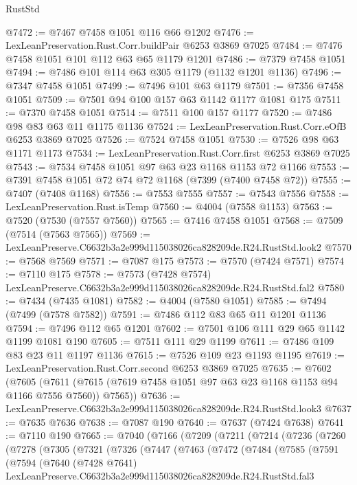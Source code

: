 \begin{lexlean}{RustStd}
\begin{coremodule}
@7472 := @7467 @7458 @1051 @116 @66 @1202
@7476 := LexLeanPreservation.Rust.Corr.buildPair @6253 @3869 @7025
@7484 := @7476 @7458 @1051 @101 @112 @63 @65 @1179 @1201
@7486 := @7379 @7458 @1051
@7494 := @7486 @101 @114 @63 @305 @1179 (@1132 @1201 @1136)
@7496 := @7347 @7458 @1051
@7499 := @7496 @101 @63 @1179
@7501 := @7356 @7458 @1051
@7509 := @7501 @94 @100 @157 @63 @1142 @1177 @1081 @175
@7511 := @7370 @7458 @1051
@7514 := @7511 @100 @157 @1177
@7520 := @7486 @98 @83 @63 @11 @1175 @1136
@7524 := LexLeanPreservation.Rust.Corr.eOfB @6253 @3869 @7025
@7526 := @7524 @7458 @1051
@7530 := @7526 @98 @63 @1171 @1173
@7534 := LexLeanPreservation.Rust.Corr.first @6253 @3869 @7025
@7543 := @7534 @7458 @1051 @97 @63 @23 @1168 @1153 @72 @1166
@7553 := @7391 @7458 @1051 @72 @74 @72 @1168 (@7399 (@7400 @7458 @72))
@7555 := @7407 (@7408 @1168)
@7556 := @7553 @7555
@7557 := @7543 @7556
@7558 := LexLeanPreservation.Rust.isTemp
@7560 := @4004 (@7558 @1153)
@7563 := @7520 (@7530 (@7557 @7560))
@7565 := @7416 @7458 @1051
@7568 := @7509 (@7514 (@7563 @7565))
@7569 := LexLeanPreserve.C6632b3a2e999d115038026ca828209de.R24.RustStd.look2
@7570 := @7568 @7569
@7571 := @7087 @175
@7573 := @7570 (@7424 @7571)
@7574 := @7110 @175
@7578 := @7573 (@7428 @7574) LexLeanPreserve.C6632b3a2e999d115038026ca828209de.R24.RustStd.fal2
@7580 := @7434 (@7435 @1081)
@7582 := @4004 (@7580 @1051)
@7585 := @7494 (@7499 (@7578 @7582))
@7591 := @7486 @112 @83 @65 @11 @1201 @1136
@7594 := @7496 @112 @65 @1201
@7602 := @7501 @106 @111 @29 @65 @1142 @1199 @1081 @190
@7605 := @7511 @111 @29 @1199
@7611 := @7486 @109 @83 @23 @11 @1197 @1136
@7615 := @7526 @109 @23 @1193 @1195
@7619 := LexLeanPreservation.Rust.Corr.second @6253 @3869 @7025
@7635 := @7602
    (@7605 (@7611 (@7615 (@7619 @7458 @1051 @97 @63 @23 @1168 @1153 @94 @1166 @7556 @7560)) @7565))
@7636 := LexLeanPreserve.C6632b3a2e999d115038026ca828209de.R24.RustStd.look3
@7637 := @7635 @7636
@7638 := @7087 @190
@7640 := @7637 (@7424 @7638)
@7641 := @7110 @190
@7665 := @7040
    (@7166
      (@7209
        (@7211
          (@7214
            (@7236
              (@7260
                (@7278
                  (@7305
                    (@7321
                      (@7326
                        (@7447
                          (@7463
                            (@7472
                              (@7484
                                (@7585
                                  (@7591
                                    (@7594
                                      (@7640
                                        (@7428 @7641)
                                        LexLeanPreserve.C6632b3a2e999d115038026ca828209de.R24.RustStd.fal3

\end{coremodule}
\end{lexlean}

